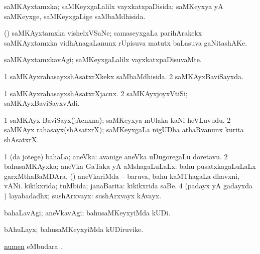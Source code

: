 \bentry
{}
\gl{\gu}
\bmng
saMKAyxtamxka; saMKeyxgaLalilx vayxkatxpaDisida; saMKeyxya yA saMKeyxge, saMKeyxgaLige saMbaMdhisida. 
\emng
\eentry

\bentry
{}
\gl{\nA}
\bmng
(\ga) saMKAyxtamxka vishelxVSaNe; samaseyxgaLa parihArakekx saMKAyxtamxka vidhAnagaLanunx rUpisuva matutx baLasuva gaNitashAKe. 
\emng
\eentry

\bentry
{}
\gl{\kirxvi}
\bmng
saMKAyxtamxkavAgi; saMKeyxgaLalilx vayxkatxpaDisuvaMte. 
\emng
\eentry

\bentry
{}
\gl{\gu}
\bmng
\bnum
\num{1} saMKAyxrahasayxshAsatxrXkekx saMbaMdhisida. 
\num{2} saMKAyxBaviSayxda. 
\enum
\emng
\eentry

\bentry
{}
\gl{\nA}
\bmng
\bnum
\num{1} saMKAyxrahasayxshAsatxrXjacnx. 
\num{2} saMKAyxjoyxVtiSi; saMKAyxBaviSayxvAdi. 
\enum
\emng
\eentry

\bentry
{}
\gl{\nA}
\bmng
\bnum
\num{1} saMKAyx BaviSayx(jAcnxna); saMKeyxya mUlaka kaNi heVLuvudu. 
\num{2} saMKAyx rahasayx(shAsatxrX); saMKeyxgaLa nigUDha athaRvanunx kurita shAsatxrX. 
\enum
\emng
\eentry

\bentry
{}
\gl{\gu}
\bmng
\bnum
\num{1} (\bava da jotege) bahaLa; aneVka:  avanige aneVka uDugoregaLu doretavu. 
\num{2} bahusaMKAyxka; aneVka GaTaka yA aMshagaLuLaLx:  bahu pusatxkagaLuLaLx garxMthaBaMDAra. 
\banum
{} (\pArxparx) aneVkariMda -- baruva,  bahu kaMThagaLa dhavxni, vANi. 
 kikikxrida; tuMbida; janaBarita:  kikikxrida saBe. 
\eanum
\numie
\num{4} (padayx yA gadayxda \vi) layabadadhx; sushArxvayx:  sushArxvayx kAvayx. 
\enum
\emng
\eentry

\bentry
{}
\gl{\kirxvi}
\bmng
bahaLavAgi; aneVkavAgi; bahusaMKeyxyiMda kUDi. 
\emng
\eentry

\bentry
{}
\gl{\nA}
\bmng
bAhuLayx; bahusaMKeyxyiMda kUDiruvike. 
\emng
\eentry

\bentry
{}
\gl{\nA}
\bmng
\hyperlink{numen}{numen} eMbudara \bava. 
\emng
\eentry

